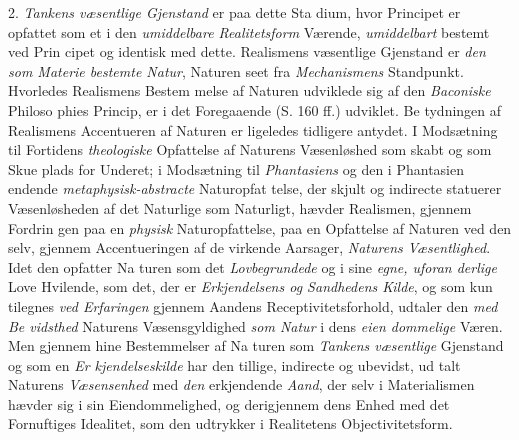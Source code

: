 2. \emph{Tankens væsentlige Gjenstand} er paa dette Sta\-%
dium, hvor Principet er opfattet som et i den \emph{umiddelbare
Realitetsform} Værende, \emph{umiddelbart} bestemt ved Prin\-%
cipet og identisk med dette. Realismens væsentlige Gjenstand
er \emph{den som Materie bestemte Natur}, Naturen seet fra
\emph{Mechanismens} Standpunkt. Hvorledes Realismens Bestem\-%
melse af Naturen udviklede sig af den \emph{Baconiske} Philoso\-%
phies Princip, er i det Foregaaende (S. 160 ff.) udviklet. Be\-%
tydningen af Realismens Accentueren af Naturen er ligeledes
tidligere antydet. I Modsætning til Fortidens \emph{theologiske}
 Opfattelse af Naturens Væsenløshed som skabt og som Skue\-%
plads for Underet; i Modsætning til \emph{Phantasiens} og den i
Phantasien endende \emph{metaphysisk-abstracte} Naturopfat\-%
telse, der skjult og indirecte statuerer Væsenløsheden af det
Naturlige som Naturligt, hævder Realismen, gjennem Fordrin\-%
gen paa en \emph{physisk} Naturopfattelse, paa en Opfattelse af
Naturen ved den selv, gjennem Accentueringen af de virkende
Aarsager, \emph{Naturens Væsentlighed}. Idet den opfatter Na\-%
turen som det \emph{Lovbegrundede} og i sine \emph{egne, uforan\-%
derlige} Love Hvilende, som det, der er \emph{Erkjendelsens og
Sandhedens Kilde}, og som kun tilegnes \emph{ved Erfaringen}
gjennem Aandens Receptivitetsforhold, udtaler den \emph{med Be\-%
vidsthed} Naturens Væsensgyldighed \emph{som Natur} i dens \emph{eien\-%
dommelige} Væren. Men gjennem hine Bestemmelser af Na\-%
turen som \emph{Tankens væsentlige} Gjenstand og som en \emph{Er\-%
kjendelseskilde} har den tillige, indirecte og ubevidst, ud\-%
talt Naturens \emph{Væsensenhed} med \emph{den} erkjendende \emph{Aand},
der selv i Materialismen hævder sig i sin Eiendommelighed,
og derigjennem dens Enhed med det Fornuftiges Idealitet, som
den udtrykker i Realitetens Objectivitetsform.

